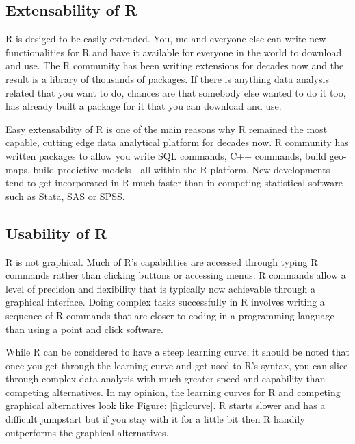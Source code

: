 \documentclass[10pt, letterpaper, twoside]{memoir}\usepackage{knitr}
\begin{document}
\subsection{Extensability of R}

R is desiged to be easily extended. You, me and everyone else can write new functionalities for R and have it available for everyone in the world to download and use. The R community has been writing extensions for decades now and the result is a library of thousands of packages. If there is anything data analysis related that you want to do, chances are that somebody else wanted to do it too, has already built a package for it that you can download and use. 

Easy extensability of R is one of the main reasons why R remained the most capable, cutting edge data analytical platform for decades now. R community has written packages to allow you write SQL commands, C++ commands, build geo-maps, build predictive models - all within the R platform. New developments tend to get incorporated in R much faster than in competing statistical software such as Stata, SAS or SPSS.     

\subsection{Usability of R}

R is not graphical. Much of R's capabilities are accessed through typing R commands rather than clicking buttons or accessing menus. R commands allow a level of precision and flexibility that is typically now achievable through a graphical interface. Doing complex tasks successfully in R involves writing a sequence of R commands that are closer to coding in a programming language than using a point and click software.

While R can be considered to have a steep learning curve, it should be noted that once you get through the learning curve and get used to R's syntax, you can slice through complex data analysis with much greater speed and capability than competing alternatives. In my opinion, the learning curves for R and competing graphical alternatives look like Figure: \ref{fig:lcurve}. R starts slower and has a difficult jumpstart but if you stay with it for a little bit then R handily outperforms the graphical alternatives.
\end{document}
